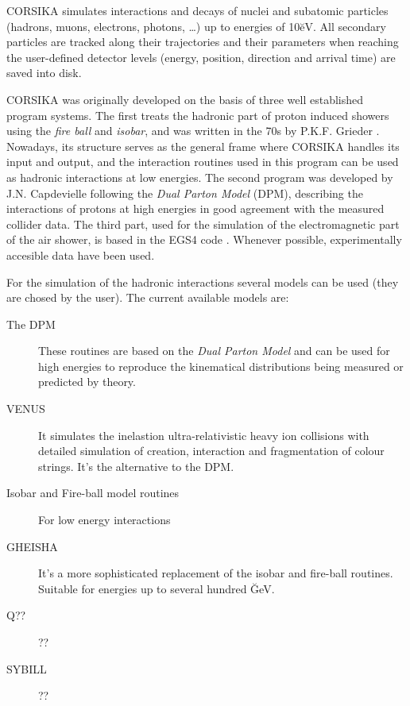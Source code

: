 CORSIKA simulates interactions and decays of nuclei and subatomic
particles (hadrons, muons, electrons, photons, \ldots) up to energies of
10\u{eV}. All secondary particles are tracked along their
trajectories and their parameters when reaching the user-defined
detector levels (energy, position, direction and arrival time) are saved
into disk.

CORSIKA was originally developed on the basis of three well established
program systems. The first treats the hadronic part of proton induced
showers using the \emph{fire ball} and \emph{isobar}, and was written in
the 70s by P.K.F. Grieder \cite{Grieder:1979}. Nowadays, its structure
serves as the general frame where CORSIKA handles its input and output,
and the interaction routines used in this program can be used as
hadronic interactions at low energies. The second program was developed
by J.N. Capdevielle \cite{Capdevielle:1989} following the \emph{Dual
  Parton Model} (DPM)\cite{Capella:1980}, describing the interactions of
protons at high energies in good agreement with the measured collider
data. The third part, used for the simulation of the electromagnetic
part of the air shower, is based in the EGS4 code \cite{EGS4}. Whenever
possible, experimentally accesible data have been used.

For the simulation of the hadronic interactions several models can be
used (they are chosed by the user). The current available models are:

\begin{description}
  
\item[The DPM] These routines are based on the \emph{Dual Parton Model}
  and can be used for high energies to reproduce the kinematical
  distributions being measured or predicted by theory.
  
\item[VENUS] It simulates the inelastion ultra-relativistic heavy ion
  collisions with detailed simulation of creation, interaction and
  fragmentation of colour strings. It's the alternative to the DPM.
  
\item[Isobar and Fire-ball model routines] For low energy interactions
  
\item[GHEISHA] It's a more sophisticated replacement of the isobar and
  fire-ball routines. Suitable for energies up to several hundred
  \u{GeV}.

\item[Q??]      ??

\item[SYBILL] ??

\end{description}

